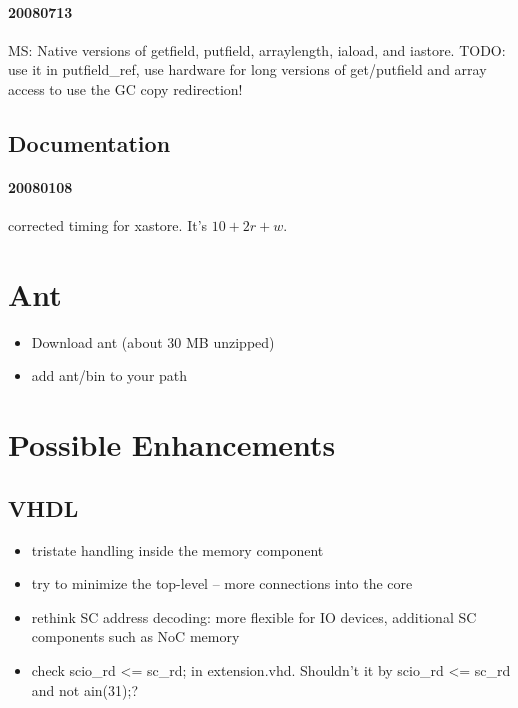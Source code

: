 \documentclass[a4paper,12pt]{scrartcl}
\newcommand{\code}[1]{{\textsf{#1}}}
\begin{document}
\paragraph{20080713} MS: Native versions of getfield, putfield,
arraylength, iaload, and iastore. TODO: use it in putfield\_ref, use
hardware for long versions of get/putfield and array access to use
the GC copy redirection!

\subsection{Documentation}

\paragraph{20080108} corrected timing for \code{xastore}. It's $10 +
2r + w$.

\section{Ant}

\begin{itemize}
    \item Download ant (about 30 MB unzipped)
    \item add ant/bin to your path
\end{itemize}

\section{Possible Enhancements}

\subsection{VHDL}

\begin{itemize}
    \item tristate handling inside the memory component
    \item try to minimize the top-level -- more connections into the
    core
    \item rethink SC address decoding: more flexible for IO devices,
    additional SC components such as NoC memory
    \item check \code{scio\_rd <= sc\_rd;} in \code{extension.vhd}.
    Shouldn't it by \code{scio\_rd <= sc\_rd and not ain(31);}?
\end{itemize}
\end{document}
